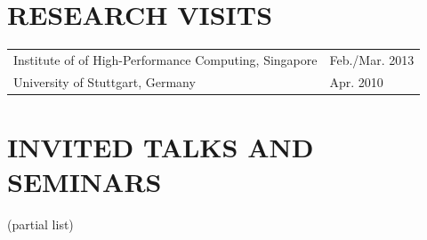\documentclass[paper=letter,fontsize=11pt]{scrartcl} %
\newcommand{\NewPart}[2]{\section*{\uppercase{#1} #2}}
\begin{document}
\NewPart{Research Visits}{}

  \begin{tabular}{p{12cm}l}
    Institute of of High-Performance Computing, Singapore & Feb./Mar. 2013 \\
    University of Stuttgart, Germany & Apr. 2010 \\
  \end{tabular}

%
%

\NewPart{Invited Talks and Seminars}{}

(partial list)
\end{document}
